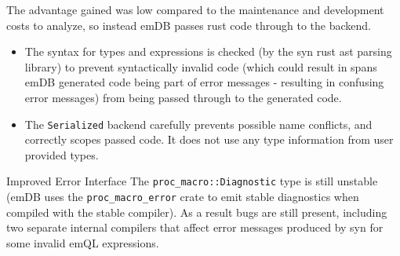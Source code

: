 The advantage gained was low compared to the maintenance and development costs to analyze, so instead emDB passes rust code through to the backend.
\begin{itemize}
    \setlength\itemsep{0em}
    \item The syntax for types and expressions is checked (by the syn rust ast parsing library) to prevent syntactically invalid code (which could result in spans emDB generated code being part of error messages - resulting in confusing error messages) from being passed through to the generated code.
    \item The \texttt{Serialized} backend carefully prevents possible name conflicts, and correctly scopes passed code. It does not use any type information from user provided types.
\end{itemize}
\begin{futurebox}{Improved Error Interface}
    The \texttt{proc_macro::Diagnostic} type is still unstable (emDB uses the \texttt{proc_macro_error} crate to emit stable diagnostics when compiled with the stable compiler).
    As a result bugs are still present, including two separate internal compilers that affect error messages produced by syn for some invalid emQL expressions.
\end{futurebox}

